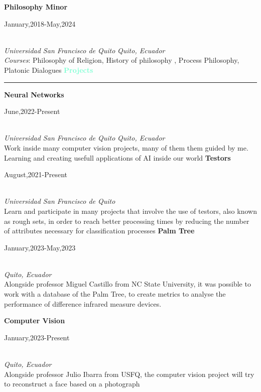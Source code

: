 \documentclass[11pt]{article}
\newenvironment{til}[2]
{
  \large
  \textcolor{Aquamarine}{\textbf{#1}}
  \vspace{0.05in}
  \textcolor{Aquamarine}{\hrule}
}{
  \vspace{0.05in}
}
\newenvironment{itemexp}[5]{
  \textbf{#1} \hfill \begin{scriptsize}#2\end{scriptsize}\\
  \scriptsize\textit{#3} \hfill \textit{#4}\\\normalsize
  \footnotesize #5}{\smallbreak}
\begin{document}
\begin{minipage}[t]{0.61\textwidth}
\begin{itemexp}
    {Philosophy Minor}{January,2018-May,2024}{Universidad
    San Francisco de Quito}{Quito, Ecuador}
    {\textit{Courses}: Philosophy of Religion, History of philosophy , Process
      Philosophy, Platonic Dialogues}
  \end{itemexp}
  \smallbreak
  \begin{til}{Projects}{1}
  \end{til}
  \begin{itemexp}
    {Neural Networks}{June,2022-Present}{Universidad
    San Francisco de Quito}{Quito, Ecuador}
    {Work inside many computer vision projects,
    many of them them guided by me. Learning and creating  
    usefull applications of AI inside our world }
  \end{itemexp}
  \begin{itemexp}
    {Testors}{August,2021-Present}{Universidad
    San Francisco de Quito}{}
    {Learn and participate in many projects that involve the use of
    testors, also known as rough sets, in order to reach better processing times
    by reducing the number of attributes necessary for classification processes}
  \end{itemexp}
  \begin{itemexp}
    {Palm Tree}{January,2023-May,2023}{}{Quito, Ecuador}{
    Alongside professor Miguel Castillo from NC State University, it was
    possible to work with a database of the Palm Tree, to create metrics to
    analyse the performance of difference infrared measure devices.
    }
  \end{itemexp}
  \begin{itemexp}
    {Computer Vision}{January,2023-Present}{}{Quito, Ecuador}{
    Alongside professor Julio Ibarra from USFQ, the computer vision project will
    try to reconstruct a face based on a photograph
    }
  \end{itemexp}
\end{minipage}
\end{document}
